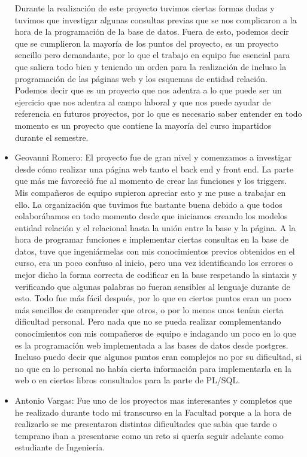 \documentclass[letterpaper,12pt]{article}
\begin{document}
\begin{itemize}
		Durante la realización de este proyecto tuvimos ciertas formas dudas y tuvimos que investigar algunas consultas previas que se nos complicaron a la hora de la programación de la base de datos. Fuera de esto, podemos decir que se cumplieron la mayoría de los puntos del proyecto, es un proyecto sencillo pero demandante, por lo que el trabajo en equipo fue esencial para que saliera todo bien y teniendo un orden para la realización de incluso la programación de las páginas web y los esquemas de entidad relación. Podemos decir que es un proyecto que nos adentra a lo que puede ser un ejercicio que nos adentra al campo laboral y que nos puede ayudar de referencia en futuros proyectos, por lo que es necesario saber entender en todo momento es un proyecto que contiene la mayoría del curso impartidos durante el semestre.
		\item Geovanni Romero:
		El proyecto fue de gran nivel y comenzamos a investigar desde cómo realizar una página web tanto el back end y front end. La parte que más me favoreció fue al momento de crear las funciones y los triggers. Mis compañeros de equipo supieron apreciar esto y me puse a trabajar en ello. La organización que tuvimos fue bastante buena debido a que todos colaborábamos en todo momento desde que iniciamos creando los modelos entidad relación y el relacional hasta la unión entre la base y la página. A la hora de programar funciones e implementar ciertas consultas en la base de datos, tuve que ingeniármelas con mis conocimientos previos obtenidos en el curso, era un poco confuso al inicio, pero una vez identificando los errores o mejor dicho la forma correcta de codificar en la base respetando la sintaxis y verificando que algunas palabras no fueran sensibles al lenguaje durante de esto. Todo fue más fácil después, por lo que en ciertos puntos eran un poco más sencillos de comprender que otros, o por lo menos unos tenían cierta dificultad personal. Pero nada que no se pueda realizar complementando conocimientos con mis compañeros de equipo e indagando un poco en lo que es la programación web implementada a las bases de datos desde postgres. Incluso puedo decir que algunos puntos eran complejos no por su dificultad, si no que en lo personal no había cierta información para implementarla en la web o en ciertos libros consultados para la parte de PL/SQL.
		\item Antonio Vargas:
		Fue uno de los proyectos mas interesantes y completos que he realizado durante todo mi transcurso en la Facultad porque a la hora de realizarlo se me presentaron distintas dificultades que sabia que tarde o temprano iban a presentarse como un reto si quería seguir adelante como estudiante de Ingeniería. 

\end{itemize}
\end{document}
